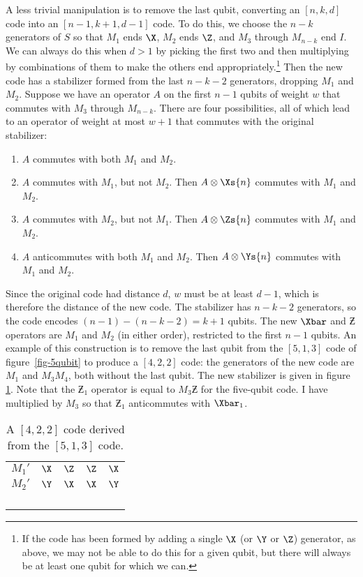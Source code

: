 A less trivial manipulation is to remove the last qubit, converting an $[n, k,
d]$ code into an $[n-1, k+1, d-1]$ code.  To do this, we choose the $n-k$
generators of $S$ so that $M_1$ ends $\X$, $M_2$ ends $\Z$, and $M_3$
through $M_{n-k}$ end $I$.  We can always do this when $d>1$ by picking
the first two and then multiplying by combinations of them to make the
others end appropriately.\footnote{If the code has been formed by adding
a single $\X$ (or $\Y$ or $\Z$) generator, as above, we may not be able to
do this for a given qubit, but there will always be at least one qubit for
which we can.}  Then the new code has a stabilizer formed from the last
$n-k-2$ generators, dropping $M_1$ and $M_2$.  Suppose we have an
operator $A$ on the first $n-1$ qubits of weight $w$ that commutes with
$M_3$ through $M_{n-k}$.  There are four possibilities, all of which lead to
an operator of weight at most $w+1$ that commutes with the original
stabilizer:
\begin{enumerate}
	\item $A$ commutes with both $M_1$ and $M_2$.
	\item $A$ commutes with $M_1$, but not $M_2$.  Then $A \otimes \Xs{n}$
	commutes with $M_1$ and $M_2$.
	\item $A$ commutes with $M_2$, but not $M_1$.  Then $A \otimes \Zs{n}$
	commutes with $M_1$ and $M_2$.
	\item $A$ anticommutes with both $M_1$ and $M_2$.  Then $A \otimes
	\Ys{n}$ commutes with $M_1$ and $M_2$.
\end{enumerate}
Since the original code had distance $d$, $w$ must be at least $d-1$,
which is therefore the distance of the new code.  The stabilizer has $n-k-2$
generators, so the code encodes $(n-1)-(n-k-2) = k+1$ qubits.  The new $\Xbar$
and $\Zbar$ operators are $M_1$ and $M_2$ (in either order), restricted to
the first $n-1$ qubits.  An example of this construction is to remove the
last qubit from the $[5,1,3]$ code of figure~\ref{fig-5qubit} to produce
a $[4,2,2]$ code: the generators of the new code are $M_1$ and $M_3 M_4$,
both without the last qubit.  The new stabilizer is given in figure
\ref{fig-droplast}.  Note that the $\Zbar_1$ operator is equal to
$M_3 \Zbar$ for the five-qubit code.  I have multiplied by $M_3$ so that
$\Zbar_1$ anticommutes with $\Xbar_1$.
\begin{table}
	\centering
	\begin{tabular}{c|cccc}
		$M_1'$ & $\X$ & $\Z$ & $\Z$ & $\X$ \\
		$M_2'$ & $\Y$ & $\X$ & $\X$ & $\Y$ \\
		\hline
		\low{$\Xbar_1$} & \low{$\X$} & \low{$\X$} & \low{$\X$} & \low{$\X$} \\
		\low{$\Xbar_2$} & \low{$\X$} & \low{$I$} & \low{$\X$} & \low{$\Z$} \\
		\low{$\Zbar_1$} & \low{$\Y$} & \low{$\Z$} & \low{$\Y$} & \low{$I$} \\
		\low{$\Zbar_2$} & \low{$I$} & \low{$\X$} & \low{$\Z$} & \low{$\Z$}
	\end{tabular}
	\caption{A $[4,2,2]$ code derived from the $[5,1,3]$ code.}
	\label{fig-droplast}
\end{table}

